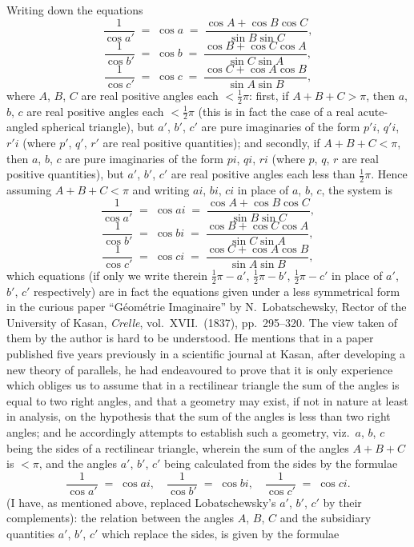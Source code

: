\documentclass[11pt]{article}
\begin{document}
Writing down the equations
\[
\frac{1}{\cos a'} \;=\; \cos a \;=\; \frac{\cos A + \cos B \cos C}{\sin B \sin C},
\]
\[
\frac{1}{\cos b'} \;=\; \cos b \;=\; \frac{\cos B + \cos C \cos A}{\sin C \sin A},
\]
\[
\frac{1}{\cos c'} \;=\; \cos c \;=\; \frac{\cos C + \cos A \cos B}{\sin A \sin B},
\]
where $A$, $B$, $C$ are real positive angles each $< \tfrac{1}{2}\pi$: first, if $A + B + C > \pi$, then $a$, $b$, $c$ are real positive angles each $< \tfrac{1}{2}\pi$ (this is in fact the case of a real acute-angled spherical triangle), but $a'$, $b'$, $c'$ are pure imaginaries of the form $p'i$, $q'i$, $r'i$ (where $p'$, $q'$, $r'$ are real positive quantities); and secondly, if $A + B + C < \pi$, then $a$, $b$, $c$ are pure imaginaries of the form $pi$, $qi$, $ri$ (where $p$, $q$, $r$ are real positive quantities), but $a'$, $b'$, $c'$ are real positive angles each less than $\tfrac{1}{2}\pi$. Hence assuming $A + B + C < \pi$ and writing $ai$, $bi$, $ci$ in place of $a$, $b$, $c$, the system is
\[
\frac{1}{\cos a'} \;=\; \cos ai \;=\; \frac{\cos A + \cos B \cos C}{\sin B \sin C},
\]
\[
\frac{1}{\cos b'} \;=\; \cos bi \;=\; \frac{\cos B + \cos C \cos A}{\sin C \sin A},
\]
\[
\frac{1}{\cos c'} \;=\; \cos ci \;=\; \frac{\cos C + \cos A \cos B}{\sin A \sin B},
\]
which equations (if only we write therein $\tfrac{1}{2}\pi - a'$, $\tfrac{1}{2}\pi - b'$, $\tfrac{1}{2}\pi - c'$ in place of $a'$, $b'$, $c'$ respectively) are in fact the equations given under a less symmetrical form in the curious paper ``G\'eom\'etrie Imaginaire'' by N.\ Lobatschewsky, Rector of the University of Kasan, \textit{Crelle}, vol.\ XVII.\ (1837), pp.\ 295--320. The view taken of them by the author is hard to be understood. He mentions that in a paper published five years previously in a scientific journal at Kasan, after developing a new theory of parallels, he had endeavoured to prove that it is only experience which obliges us to assume that in a rectilinear triangle the sum of the angles is equal to two right angles, and that a geometry may exist, if not in nature at least in analysis, on the hypothesis that the sum of the angles is less than two right angles; and he accordingly attempts to establish such a geometry, viz.\ $a$, $b$, $c$ being the sides of a rectilinear triangle, wherein the sum of the angles $A + B + C$ is $< \pi$, and the angles $a'$, $b'$, $c'$ being calculated from the sides by the formulae
\[
\frac{1}{\cos a'} \;=\; \cos ai,\quad \frac{1}{\cos b'} \;=\; \cos bi,\quad \frac{1}{\cos c'} \;=\; \cos ci.
\]
(I have, as mentioned above, replaced Lobatschewsky's $a'$, $b'$, $c'$ by their complements): the relation between the angles $A$, $B$, $C$ and the subsidiary quantities $a'$, $b'$, $c'$ which replace the sides, is given by the formulae
\end{document}
